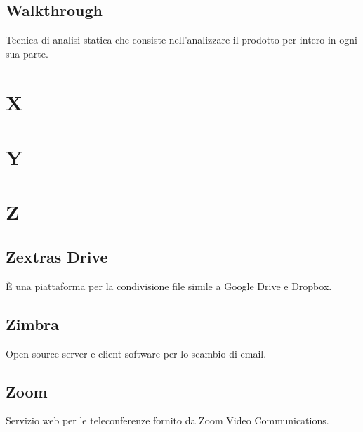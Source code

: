 \subsection{Walkthrough} Tecnica di analisi statica che consiste nell’analizzare il prodotto per intero in ogni sua parte.
\newpage \section{X}
\newpage \section{Y}
\newpage \section{Z}
\subsection{Zextras Drive} È una piattaforma per la condivisione file simile a Google Drive e Dropbox.
\subsection{Zimbra} Open source server e client software per lo scambio di email.
\subsection{Zoom} Servizio web per le teleconferenze fornito da  Zoom Video Communications.